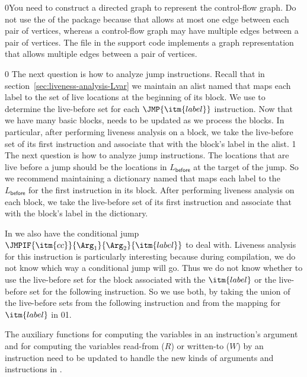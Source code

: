 \documentclass[7x10]{TimesAPriori_MIT}%
\def\racketEd{0}
\def\pythonEd{1}
\def\edition{1}
\newcommand{\racket}[1]{{\if\edition\racketEd{#1}\fi}}
\newcommand{\pythonColor}[0]{}
\newcommand{\python}[1]{{\if\edition\pythonEd\pythonColor #1\fi}}
\numberwithin{theorem}{chapter}
\numberwithin{definition}{chapter}
\numberwithin{equation}{chapter}
\begin{document}
\racket{You need to construct a directed graph to represent the
  control-flow graph. Do not use the \code{directed-graph} of the
  \code{graph} package because that allows at most one edge
  between each pair of vertices, whereas a control-flow graph may have
  multiple edges between a pair of vertices. The \code{multigraph.rkt}
  file in the support code implements a graph representation that
  allows multiple edges between a pair of vertices.}

{\if\edition\racketEd
The next question is how to analyze jump instructions.  Recall that in
section~\ref{sec:liveness-analysis-Lvar} we maintain an alist named
 that maps each label to the set of live locations
at the beginning of its block. We use  to determine
the live-before set for each $\JMP{\itm{label}}$ instruction.  Now
that we have many basic blocks,  needs to be updated
as we process the blocks. In particular, after performing liveness
analysis on a block, we take the live-before set of its first
instruction and associate that with the block's label in the
 alist.
\fi}
%
{\if\edition\pythonEd\pythonColor
%
The next question is how to analyze jump instructions.  The locations
that are live before a jump should be the locations in
$L_{\mathsf{before}}$ at the target of the jump. So we recommend
maintaining a dictionary named  that maps each
label to the $L_{\mathsf{before}}$ for the first instruction in its
block. After performing liveness analysis on each block, we take the
live-before set of its first instruction and associate that with the
block's label in the  dictionary.
%
\fi}

In \LangXIfVar{} we also have the conditional jump
$\JMPIF{\itm{cc}}{\Arg_1}{\Arg_2}{\itm{label}}$ to deal with.  Liveness analysis for
this instruction is particularly interesting because during
compilation, we do not know which way a conditional jump will go. Thus
we do not know whether to use the live-before set for the block
associated with the $\itm{label}$ or the live-before set for the
following instruction. So we use both, by taking the union of the
live-before sets from the following instruction and from the mapping
for $\itm{label}$ in
\racket{}\python{}.

The auxiliary functions for computing the variables in an
instruction's argument and for computing the variables read-from ($R$)
or written-to ($W$) by an instruction need to be updated to handle the
new kinds of arguments and instructions in \LangXIfVar{}.
\end{document}
